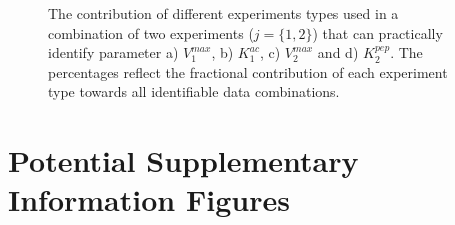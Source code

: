 \documentclass[10pt]{article}
\begin{document}
	\begin{figure}[!tbhp]
		\caption{The contribution of different experiments types used in a combination of two experiments ($j = \{1, 2\}$) that can practically identify parameter a) $V_1^{max}$, b) $K_1^{ac}$, c) $V_2^{max}$ and d) $K_2^{pep}$. The percentages reflect the fractional contribution of each experiment type towards all identifiable data combinations.}\label{fig:exp_info}
	\end{figure} 
	
	\clearpage

	\section{Potential Supplementary Information Figures}		
	
\end{document}
